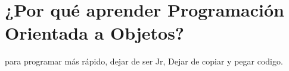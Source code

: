 \documentclass{article}
\begin{document}
    \section{¿Por qué aprender Programación Orientada a Objetos?}
    para programar más rápido, dejar de ser Jr, Dejar de copiar y pegar codigo.
    
\end{document}
